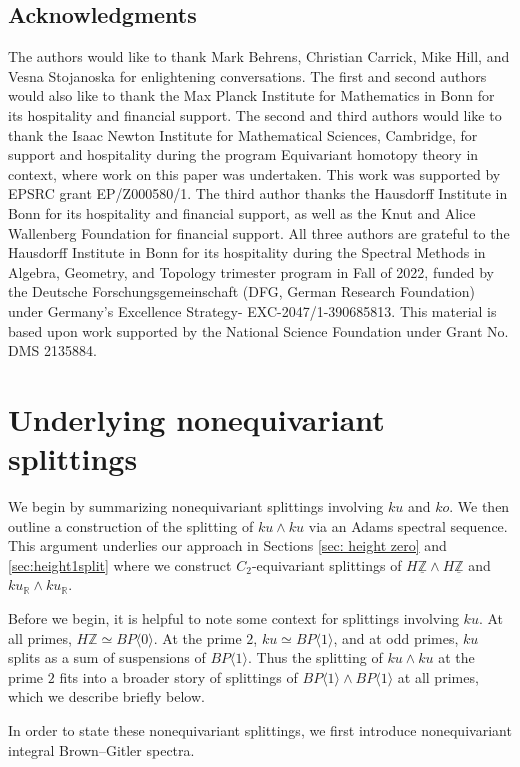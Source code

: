 \documentclass{amsart}
\theoremstyle{plain}
\numberwithin{equation}{section}
\numberwithin{figure}{section}
\newcommand{\mR}{{\mathbb R}}
\newcommand{\mZ}{{\mathbb Z}}
\newcommand{\umZ}{\underline{\mZ}}
\newcommand{\0}{\langle 0 \rangle }
\newcommand{\one}{\langle 1 \rangle }
\begin{document}
\subsection*{Acknowledgments}

The authors would like to thank Mark Behrens, Christian Carrick, Mike Hill, and Vesna Stojanoska for enlightening conversations. The first and second authors would also like to thank the Max Planck Institute for Mathematics in Bonn for its hospitality and financial support. The second and third authors would like to thank the Isaac Newton Institute for Mathematical Sciences, Cambridge, for support and hospitality during the program Equivariant homotopy theory in context, where work on this paper was undertaken. This work was supported by EPSRC grant EP/Z000580/1. The third author thanks the Hausdorff Institute in Bonn for its hospitality and financial support, as well as the Knut and Alice Wallenberg Foundation for financial support. All three authors are grateful to the Hausdorff Institute in Bonn for its hospitality during the Spectral Methods in Algebra, Geometry, and Topology trimester program in Fall of 2022, funded by the Deutsche Forschungsgemeinschaft (DFG, German Research Foundation) under Germany's Excellence Strategy- EXC-2047/1-390685813. This material is based upon work supported by the National Science Foundation under Grant No. DMS 2135884.

\section{Underlying nonequivariant splittings} \label{sec:UnderlyingSplittings}
We begin by summarizing nonequivariant splittings involving $ku$ and $ko.$ We then outline a construction of the splitting of $ku \wedge ku$ via an Adams spectral sequence. This argument underlies our approach in Sections \ref{sec: height zero} and \ref{sec:height1split} where we construct $C_2$-equivariant splittings of $H \umZ \wedge H \umZ$ and $ku_\mR \wedge ku_\mR$. 

Before we begin, it is helpful to note some context for splittings involving $ku$. At all primes, $H\mZ \simeq BP\langle 0 \rangle$. At the prime $2$, $ku \simeq BP\one$, and at odd primes, $ku$ splits as a sum of suspensions of $BP\one$. Thus the splitting of $ku \wedge ku$ at the prime $2$ fits into a broader story of splittings of $BP \langle 1 \rangle \wedge BP \langle 1 \rangle$ at all primes, which we describe briefly below.

In order to state these nonequivariant splittings, we first introduce nonequivariant integral Brown--Gitler spectra. 
\end{document}
